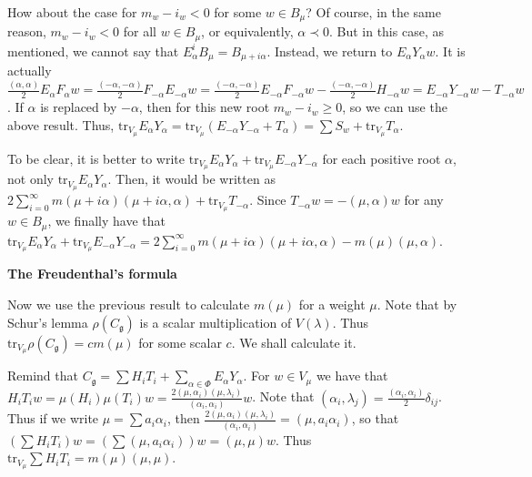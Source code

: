 \documentclass{article}
\newcommand{\tru}[2]{\mathrm{tr}_{#1}#2}
\newcommand{\lie}[1]{\mathfrak{#1}}
\begin{document}
How about the case for $m_w - i_w < 0$ for some $w \in B_\mu$?
Of course, in the same reason, $m_w - i_w < 0$ for all $w \in B_\mu$, or equivalently, $\alpha \prec 0$.
But in this case, as mentioned, we cannot say that $E_\alpha^i B_\mu = B_{\mu + i\alpha}$.
Instead, we return to $E_\alpha Y_\alpha w$.
It is actually $\frac{(\alpha, \alpha)}{2} E_\alpha F_\alpha w = \frac{(-\alpha, -\alpha)}{2} F_{-\alpha} E_{-\alpha} w = \frac{(-\alpha, -\alpha)}{2} E_{-\alpha} F_{-\alpha} w - \frac{(-\alpha, -\alpha)}{2} H_{-\alpha} w = E_{-\alpha} Y_{-\alpha} w - T_{-\alpha} w$.
If $\alpha$ is replaced by $-\alpha$, then for this new root $m_w - i_w \ge 0$, so we can use the above result.
Thus, $\tru{V_\mu}{E_\alpha Y_\alpha} = \tru{V_\mu}{(E_{-\alpha} Y_{-\alpha} + T_\alpha)} = \sum S_w + \tru{V_\mu}{T_\alpha}$.

To be clear, it is better to write $\tru{V_\mu}{E_\alpha Y_\alpha} + \tru{V_\mu}{E_{-\alpha} Y_{-\alpha}}$ for each positive root $\alpha$, not only $\tru{V_\mu}{E_\alpha Y_\alpha}$.
Then, it would be written as $2 \sum_{i = 0}^\infty m(\mu + i\alpha) (\mu + i\alpha, \alpha) + \tru{V_\mu}{T_{-\alpha}}$.
Since $T_{-\alpha} w = -(\mu, \alpha)w$ for any $w \in B_\mu$, we finally have that $\tru{V_\mu}{E_\alpha Y_\alpha} + \tru{V_\mu}{E_{-\alpha} Y_{-\alpha}} = 2 \sum_{i = 0}^\infty m(\mu + i\alpha) (\mu + i\alpha, \alpha) - m(\mu) (\mu, \alpha)$.

\newpage

\textbf{The Freudenthal's formula}

Now we use the previous result to calculate $m(\mu)$ for a weight $\mu$.
Note that by Schur's lemma $\rho(C_\lie{g})$ is a scalar multiplication of $V(\lambda)$.
Thus $\tru{V_\mu}{\rho(C_\lie{g})} = cm(\mu)$ for some scalar $c$.
We shall calculate it.

Remind that $C_\lie{g} = \sum H_i T_i + \sum_{\alpha \in \Phi} E_\alpha Y_\alpha$.
For $w \in V_\mu$ we have that $H_i T_i w = \mu(H_i) \mu(T_i) w = \frac{2(\mu, \alpha_i)(\mu, \lambda_i)}{(\alpha_i, \alpha_i)} w$.
Note that $(\alpha_i, \lambda_j) = \frac{(\alpha_i, \alpha_i)}{2} \delta_{ij}$.
Thus if we write $\mu = \sum a_i \alpha_i$, then $\frac{2(\mu, \alpha_i)(\mu, \lambda_i)}{(\alpha_i, \alpha_i)} = (\mu, a_i \alpha_i)$, so that $(\sum H_i T_i) w = (\sum (\mu, a_i \alpha_i)) w = (\mu, \mu) w$.
Thus $\tru{V_\mu}{\sum H_i T_i} = m(\mu) (\mu, \mu)$.
\end{document}
